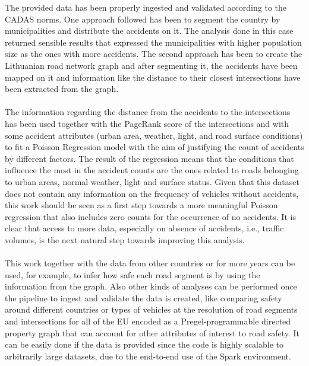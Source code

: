The provided data has been properly ingested and validated according to the \ac{CADAS} norms. One approach followed has been to segment the country by municipalities and distribute the accidents on it. The analysis done in this case returned sensible results that expressed the municipalities with higher population size as the ones with more accidents. The second approach has been to create the Lithuanian road network graph and after segmenting it, the accidents have been mapped on it and information like the distance to their closest intersections have been extracted from the graph. \\
\\
The information regarding the distance from the accidents to the intersections has been used together with the PageRank score of the intersections and with some accident attributes (urban area, weather, light, and road surface conditions) to fit a Poisson Regression model with the aim of justifying the count of accidents by different factors. The result of the regression means that the conditions that influence the most in the accident counts are the ones related to roads belonging to urban areas, normal weather, light and surface status. 
Given that this dataset does not contain any information on the frequency of vehicles without accidents, this work should be seen as a first step towards a more meaningful Poisson regression that also includes zero counts for the occurrence of no accidents.
It is clear that access to more data, especially on absence of accidents, i.e., traffic volumes, is the next natural step towards improving this analysis. 
\\
\\
This work together with the data from other countries or for more years can be used, for example, to infer how safe each road segment is by using the information from the graph. 
Also other kinds of analyses can be performed once the pipeline to ingest and validate the data is created, like comparing safety around different countries or types of vehicles at the resolution of road segments and intersections for all of the EU encoded as a Pregel-programmable directed property graph that can account for other attributes of interest to road safety. It can be easily done if the data is provided since the code is highly scalable to arbitrarily large datasets, due to the end-to-end use of the Spark environment. 
